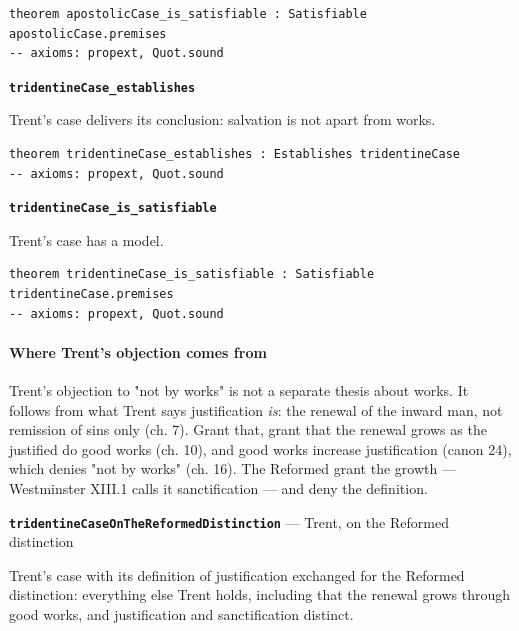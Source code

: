 \documentclass[11pt]{article}
\begin{document}
{\small\begin{verbatim}
theorem apostolicCase_is_satisfiable : Satisfiable apostolicCase.premises
-- axioms: propext, Quot.sound
\end{verbatim}}
\par\medskip\noindent\textbf{\texttt{tridentine\allowbreak{}Case\_\allowbreak{}establishes}}\par\nobreak\noindent
Trent's case delivers its conclusion: salvation is not apart from works.

{\small\begin{verbatim}
theorem tridentineCase_establishes : Establishes tridentineCase
-- axioms: propext, Quot.sound
\end{verbatim}}
\par\medskip\noindent\textbf{\texttt{tridentine\allowbreak{}Case\_\allowbreak{}is\_\allowbreak{}satisfiable}}\par\nobreak\noindent
Trent's case has a model.

{\small\begin{verbatim}
theorem tridentineCase_is_satisfiable : Satisfiable tridentineCase.premises
-- axioms: propext, Quot.sound
\end{verbatim}}
\paragraph*{Where Trent's objection comes from}
\leavevmode\par
Trent's objection to "not by works" is not a separate thesis about works. It follows from what Trent says justification \emph{is}: the renewal of the inward man, not remission of sins only (ch. 7). Grant that, grant that the renewal grows as the justified do good works (ch. 10), and good works increase justification (canon 24), which denies "not by works" (ch. 16). The Reformed grant the growth — Westminster XIII.1 calls it sanctification — and deny the definition.

\par\medskip\noindent\textbf{\texttt{tridentine\allowbreak{}Case\allowbreak{}On\allowbreak{}The\allowbreak{}Reformed\allowbreak{}Distinction}} --- Trent, on the Reformed distinction\par\nobreak\noindent
Trent's case with its definition of justification exchanged for the Reformed distinction: everything else Trent holds, including that the renewal grows through good works, and justification and sanctification distinct.
\end{document}
